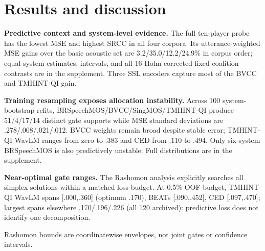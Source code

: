 \documentclass{article}
\begin{document}
\section{Results and discussion}
\label{sec:results}

\noindent\textbf{Predictive context and system-level evidence.}
The full ten-player probe has the lowest MSE and highest SRCC in all four
corpora. Its utterance-weighted MSE gains over the basic acoustic set are
3.2/35.0/12.2/24.9\% in corpus order; equal-system estimates, intervals, and
all 16 Holm-corrected fixed-coalition contrasts are in the supplement. Three
SSL encoders capture most of the BVCC and TMHINT-QI gain.

\noindent\textbf{Training resampling exposes allocation instability.}
Across 100 system-bootstrap refits, BRSpeechMOS/BVCC/SingMOS/TMHINT-QI
produce 51/4/17/14 distinct gate supports while MSE standard deviations are
.278/.008/.021/.012. BVCC weights remain broad despite stable error; TMHINT-QI
WavLM ranges from zero to .383 and CED from .110 to .494. Only six-system
BRSpeechMOS is also predictively unstable. Full distributions are in the
supplement.

\noindent\textbf{Near-optimal gate ranges.} The Rashomon analysis
explicitly searches all simplex solutions within a matched loss budget.
At 0.5\% OOF budget, TMHINT-QI WavLM spans [.000,.360] (optimum .170),
BEATs [.090,.452], CED [.097,.470]; largest spans elsewhere .170/.196/.226
(all 120 archived): predictive loss does not identify one decomposition.

Rashomon bounds are coordinatewise envelopes, not joint gates or confidence intervals.
\end{document}
